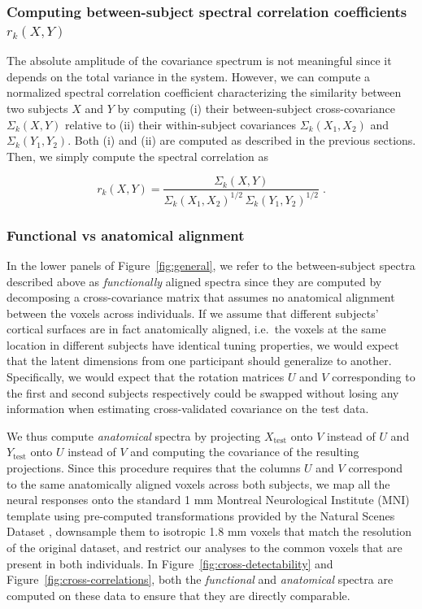 \documentclass[10pt]{article}
\begin{document}
\subsubsection{\texorpdfstring{Computing between-subject spectral correlation coefficients \(r_k(X, Y)\)}{Computing between-subject spectral correlation coefficients r\_k(X, Y)}}\label{computing-between-subject-spectral-correlation-coefficients-r_kx-y}

The absolute amplitude of the covariance spectrum is not meaningful since it depends on the total variance in the system. However, we can compute a normalized spectral correlation coefficient characterizing the similarity between two subjects \(X\) and \(Y\) by computing (i) their between-subject cross-covariance \(\Sigma_k(X, Y)\) relative to (ii) their within-subject covariances \(\Sigma_k(X_1, X_2)\) and \(\Sigma_k(Y_1, Y_2)\). Both (i) and (ii) are computed as described in the previous sections. Then, we simply compute the spectral correlation as

\[
r_k(X, Y) = \frac{\Sigma_k(X, Y)}{\Sigma_k(X_1, X_2)^{1/2}\, \Sigma_k(Y_1, Y_2)^{1/2}}\;.
\]

\subsubsection{Functional vs anatomical alignment}\label{functional-vs-anatomical-alignment}

In the lower panels of Figure~\ref{fig:general}, we refer to the between-subject spectra described above as \emph{functionally} aligned spectra since they are computed by decomposing a cross-covariance matrix that assumes no anatomical alignment between the voxels across individuals. If we assume that different subjects' cortical surfaces are in fact anatomically aligned, i.e.~the voxels at the same location in different subjects have identical tuning properties, we would expect that the latent dimensions from one participant should generalize to another. Specifically, we would expect that the rotation matrices \(U\) and \(V\) corresponding to the first and second subjects respectively could be swapped without losing any information when estimating cross-validated covariance on the test data.

We thus compute \emph{anatomical} spectra by projecting \(X_\text{test}\) onto \(V\) instead of \(U\) and \(Y_\text{test}\) onto \(U\) instead of \(V\) and computing the covariance of the resulting projections. Since this procedure requires that the columns \(U\) and \(V\) correspond to the same anatomically aligned voxels across both subjects, we map all the neural responses onto the standard 1 mm Montreal Neurological Institute (MNI) template using pre-computed transformations provided by the Natural Scenes Dataset \autocite{Allen2021}, downsample them to isotropic 1.8 mm voxels that match the resolution of the original dataset, and restrict our analyses to the common voxels that are present in both individuals. In Figure~\ref{fig:cross-detectability} and Figure~\ref{fig:cross-correlations}, both the \emph{functional} and \emph{anatomical} spectra are computed on these data to ensure that they are directly comparable.
\end{document}
